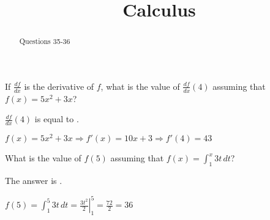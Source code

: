 \documentclass{ximera}
\title{Calculus}
\begin{document}
\begin{abstract}
  Questions 35-36
\end{abstract}
\maketitle

\begin{question}
If $\frac{df}{dx}$ is the derivative of $f$, what is the value of
$\frac{df}{dx}(4)$ assuming that $f(x) = 5x^2 +3x$?

\begin{solution}
$\frac{df}{dx}(4)$ is equal to .
\end{solution}
$f(x) = 5x^2 + 3x \Rightarrow f'(x) = 10 x + 3 \Rightarrow f'(4) = 43$
\end{question}

\begin{question}
What is the value of $f(5) $ assuming that $f(x) = \int_1^x 3t \,dt$?
\begin{solution}
The answer is .
\end{solution}
$f(5) = \int_1^5 3t \,dt = \left. \frac{3t^2}{2} \right|_1^5 =
\frac{72}{2} = 36$
\end{question}
\end{document}
